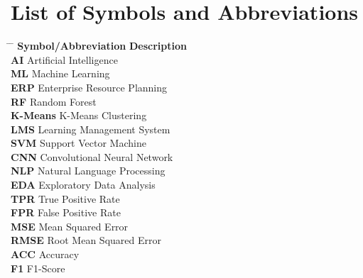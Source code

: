 %
%
%
%
%
%

\hspace{7}

\chapter*{List of Symbols and Abbreviations}
\hspace{2}


\begin{tabbing}
\hspace{6cm} \= \hspace{5cm} \= \kill
\textbf{Symbol/Abbreviation} \> \textbf{Description} \\

\textbf{AI} \> Artificial Intelligence \\  
\textbf{ML} \> Machine Learning \\  
\textbf{ERP} \> Enterprise Resource Planning \\  
\textbf{RF} \> Random Forest \\  
\textbf{K-Means} \> K-Means Clustering \\  
\textbf{LMS} \> Learning Management System \\  
\textbf{SVM} \> Support Vector Machine \\  
\textbf{CNN} \> Convolutional Neural Network \\  
\textbf{NLP} \> Natural Language Processing \\  
\textbf{EDA} \> Exploratory Data Analysis \\  
\textbf{TPR} \> True Positive Rate \\  
\textbf{FPR} \> False Positive Rate \\  
\textbf{MSE} \> Mean Squared Error \\  
\textbf{RMSE} \> Root Mean Squared Error \\  
\textbf{ACC} \> Accuracy \\  
\textbf{F1} \> F1-Score \\  

\end{tabbing}


